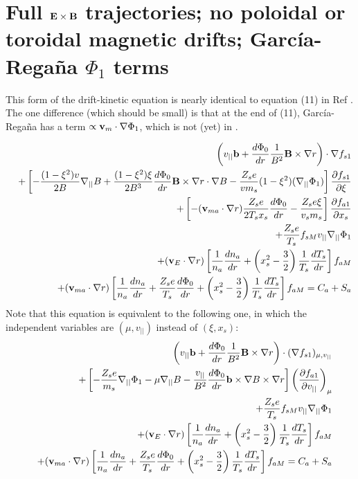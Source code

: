 \section{Full ${\mathbf E}\times{\mathbf B}$ trajectories; no poloidal or toroidal magnetic drifts; Garc\'{i}a-Rega\~{n}a $\Phi_1$ terms}

This form of the drift-kinetic equation is nearly identical to equation (11) in Ref \cite{Regana2017}.
The one difference (which should be small) is that at the end of (11), Garc\'{i}a-Rega\~{n}a
has a term $\propto {\mathbf v}_m \cdot \nabla \Phi_1$, which is not (yet) in \sfincs.

\begin{eqnarray}
&&\left(v_{||}{\mathbf b} + \frac{d\Phi_0}{dr} \frac{1}{B^2} {\mathbf B}\times\nabla r \right) \cdot \nabla f_{s1} \\
&&+ \left[ - \frac{(1-\xi^2)v}{2B} \nabla_{||} B
+\frac{(1-\xi^2)\xi}{2B^3} \frac{d\Phi_0}{dr}{\mathbf B}\times\nabla r\cdot\nabla B 
-\frac{Z_s e}{v m_s}(1-\xi^2)(\nabla_{||}\Phi_1)
\right]
 \frac{\partial f_{s1}}{\partial \xi} \nonumber \\
&&+ \left[
-({\mathbf v}_{ma} \cdot\nabla r) \frac{Z_s e}{2 T_s x_s} \frac{d\Phi_0}{dr} 
-\frac{Z_s e \xi}{v_s m_s}
\right] \frac{\partial f_{a1}}{\partial x_s} \nonumber \\
&&+\frac{Z_s e}{T_s} f_{sM} v_{||} \nabla_{||} \Phi_1 \nonumber \\
&& + ({\mathbf v}_E \cdot \nabla r) \left[ \frac{1}{n_a} \frac{dn_a}{dr}  + \left(x_s^2-\frac{3}{2}\right) \frac{1}{T_s} \frac{dT_s}{dr}\right] f_{aM} \nonumber \\
&&+ ({\mathbf v}_{ma} \cdot \nabla r) \left[ \frac{1}{n_a} \frac{dn_a}{dr} + \frac{Z_s e}{T_s} \frac{d\Phi_0}{dr} + \left(x_s^2-\frac{3}{2}\right) \frac{1}{T_s} \frac{dT_s}{dr}\right] f_{aM}
 = C_a + S_a \nonumber
\end{eqnarray}
Note that this equation is equivalent to the following one, in which the independent variables
are $(\mu,v_{||})$ instead of $(\xi,x_s)$:
\begin{eqnarray}
&&\left(v_{||}{\mathbf b} + \frac{d\Phi_0}{dr} \frac{1}{B^2} {\mathbf B}\times\nabla r \right) \cdot (\nabla f_{s1})_{\mu, v_{||}} \\
&&+ \left[ -\frac{Z_s e}{m_s} \nabla_{||} \Phi_1
- \mu \nabla_{||} B
-\frac{v_{||}}{B^2} \frac{d\Phi_0}{dr} {\mathbf b}\times\nabla B \times \nabla r \right]
\left( \frac{\partial f_{a1}}{\partial v_{||}} \right)_{\mu} \nonumber \\
&&+\frac{Z_s e}{T_s} f_{sM} v_{||} \nabla_{||} \Phi_1 \nonumber \\
&& + ({\mathbf v}_E \cdot \nabla r) \left[ \frac{1}{n_a} \frac{dn_a}{dr}  + \left(x_s^2-\frac{3}{2}\right) \frac{1}{T_s} \frac{dT_s}{dr}\right] f_{aM} \nonumber \\
&& + ({\mathbf v}_{ma} \cdot \nabla r) \left[ \frac{1}{n_a} \frac{dn_a}{dr} + \frac{Z_s e}{T_s} \frac{d\Phi_0}{dr} + \left(x_s^2-\frac{3}{2}\right) \frac{1}{T_s} \frac{dT_s}{dr}\right] f_{aM}
=C_a + S_a \nonumber
\end{eqnarray}
